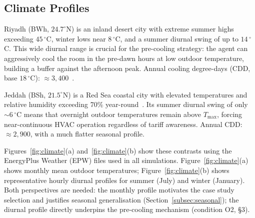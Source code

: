 \documentclass[12pt,a4paper]{article}
\let\oldsubsection\subsection
\renewcommand{\subsection}[1]{\FloatBarrier\oldsubsection{#1}}
\newcommand{\Tmax}{T_{\max}}
\begin{document}
\subsection{Climate Profiles}
\label{subsec:climate}

Riyadh (BWh, $24.7^\circ$N) is an inland desert city with extreme
summer highs exceeding $45\,^\circ$C, winter lows near $8\,^\circ$C,
and a summer diurnal swing of up to $14\,^\circ$C.
This wide diurnal range is crucial for the pre-cooling strategy: the
agent can aggressively cool the room in the pre-dawn hours at low
outdoor temperature, building a buffer against the afternoon peak.
Annual cooling degree-days (CDD, base $18\,^\circ$C):
$\approx3{,}400$~\cite{Haddad2024}.

Jeddah (BSh, $21.5^\circ$N) is a Red Sea coastal city with elevated
temperatures and relative humidity exceeding 70\% year-round~\cite{Rodrigues2025}.
Its summer diurnal swing of only ${\sim}6\,^\circ$C means that overnight
outdoor temperatures remain above $\Tmax$, forcing near-continuous
HVAC operation regardless of tariff awareness.
Annual CDD: $\approx2{,}900$, with a much flatter seasonal profile.

Figures~\ref{fig:climate}(a) and~\ref{fig:climate}(b) show these
contrasts using the EnergyPlus Weather (EPW) files used in all
simulations.
Figure~\ref{fig:climate}(a) shows monthly mean outdoor temperatures;
Figure~\ref{fig:climate}(b) shows representative hourly diurnal profiles
for summer (July) and winter (January).
Both perspectives are needed: the monthly profile motivates the case
study selection and justifies seasonal generalisation
(Section~\ref{subsec:seasonal}); the diurnal profile directly
underpins the pre-cooling mechanism (condition O2, §3).
\end{document}
